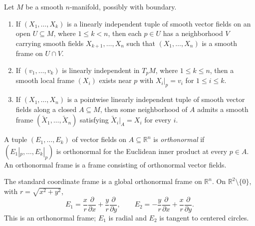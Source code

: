 \begin{proposition}
\label{prop:8-11}




Let $M$ be a smooth $n$-manifold, possibly with boundary.
\begin{enumerate}
\item If $(X_1,\ldots,X_k)$ is a linearly independent tuple of smooth vector
fields on an open $U\subseteq M$, where $1\leq k<n$, then each $p\in U$ has a
neighborhood $V$ carrying smooth fields $X_{k+1},\ldots,X_n$ such that
$(X_1,\ldots,X_n)$ is a smooth frame on $U\cap V$.
\item If $(v_1,\ldots,v_k)$ is linearly independent in $T_pM$, where
$1\leq k\leq n$, then a smooth local frame $(X_i)$ exists near $p$ with
$X_i|_p=v_i$ for $1\leq i\leq k$.
\item If $(X_1,\ldots,X_n)$ is a pointwise linearly independent tuple of
smooth vector fields along a closed $A\subseteq M$, then some neighborhood of
$A$ admits a smooth frame $(\widetilde X_1,\ldots,\widetilde X_n)$ satisfying
$\widetilde X_i|_A=X_i$ for every $i$.
\end{enumerate}
\end{proposition}

\begin{definition}
\label{def:8-55-extra-2}




A tuple $(E_1,\ldots,E_k)$ of vector fields on $A\subseteq\mathbb{R}^n$ is
\emph{orthonormal} if $(E_1|_p,\ldots,E_k|_p)$ is orthonormal for the Euclidean
inner product at every $p\in A$. An orthonormal frame is a frame consisting of
orthonormal vector fields.
\end{definition}

\begin{example}
\label{ex:8-12}




The standard coordinate frame is a global orthonormal frame on $\mathbb{R}^n$.
On $\mathbb{R}^2\setminus\{0\}$, with $r=\sqrt{x^2+y^2}$,
\[
E_1=\frac{x}{r}\frac{\partial}{\partial x}
   +\frac{y}{r}\frac{\partial}{\partial y},\qquad
E_2=-\frac{y}{r}\frac{\partial}{\partial x}
   +\frac{x}{r}\frac{\partial}{\partial y}. \tag{8.3}
\]
This is an orthonormal frame; $E_1$ is radial and $E_2$ is tangent to centered
circles.
\end{example}

